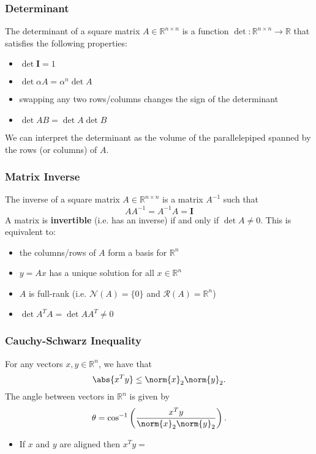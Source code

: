 \documentclass[11pt]{article}
\begin{document}
\subsubsection*{Determinant}
The determinant of a square matrix $A \in \mathbb{R}^{n\times n}$ is a function $\det: \mathbb{R}^{n\times n} \rightarrow \mathbb{R}$ that satisfies the following properties:
\begin{itemize}
    \item $\det \bm{I} = 1$
    \item $\det \alpha A = \alpha^n \det A$
    \item swapping any two rows/columns changes the sign of the determinant 
    \item $\det AB = \det A \det B$
\end{itemize} 
We can interpret the determinant as the volume of the parallelepiped spanned by the rows (or columns) of $A$. \par

\subsubsection*{Matrix Inverse} 
The inverse of a square matrix $A \in \mathbb{R}^{n\times n}$ is a matrix $A^{-1}$ such that 
\[ AA^{-1} = A^{-1}A = \bm{I} \] 
A matrix is \textbf{invertible} (i.e. has an inverse) if and only if $\det A \neq 0$. This is equivalent to: 
\begin{itemize}
    \item the columns/rows of $A$ form a basis for $\mathbb{R}^n$
    \item $y = Ax$ has a unique solution for all $x \in \mathbb{R}^n$
    \item $A$ is full-rank (i.e. $\mathcal{N}(A) = \{ 0 \}$ and $\mathcal{R}(A) = \mathbb{R}^n$)
    \item $\det A^TA = \det AA^T \neq 0$
\end{itemize}

\subsubsection*{Cauchy-Schwarz Inequality}
For any vectors $x, y \in \mathbb{R}^n$, we have that 
\[ \abs{x^Ty} \leq \norm{x}_2 \norm{y}_2. \] 
The angle between vectors in $\mathbb{R}^n$ is given by 
\[ \theta = \cos^{-1}\left( \frac{x^Ty}{\norm{x}_2\norm{y}_2} \right). \] 
\begin{itemize}
    \item If $x$ and $y$ are aligned then $x^Ty = $
\end{itemize}
\end{document}
